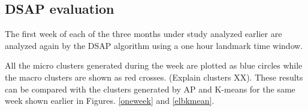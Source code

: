 \subsection{DSAP evaluation}


The first week of each of the three months under study analyzed earlier are analyzed again by the DSAP algorithm using a one hour landmark time window. 

All the micro clusters generated during the week are plotted as blue circles while the macro clusters are shown as red crosses. (Explain clusters XX). These results can be compared with the clusters generated by AP and K-means for the same week shown earlier in Figures. \ref{oneweek} and \ref{elbkmean}. 







